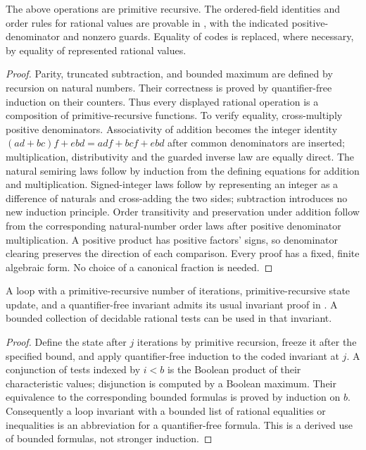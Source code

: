 \begin{proposition}\label{found:rat}
The above operations are primitive recursive. The ordered-field identities and order rules for rational values are provable in \ipra, with the indicated positive-denominator and nonzero guards. Equality of codes is replaced, where necessary, by equality of represented rational values.
\end{proposition}
\begin{proof}
Parity, truncated subtraction, and bounded maximum are defined by recursion on natural numbers. Their correctness is proved by quantifier-free induction on their counters. Thus every displayed rational operation is a composition of primitive-recursive functions. To verify equality, cross-multiply positive denominators. Associativity of addition becomes the integer identity
$(ad+bc)f+ebd=adf+bcf+ebd$ after common denominators are inserted; multiplication, distributivity and the guarded inverse law are equally direct. The natural semiring laws follow by induction from the defining equations for addition and multiplication. Signed-integer laws follow by representing an integer as a difference of naturals and cross-adding the two sides; subtraction introduces no new induction principle. Order transitivity and preservation under addition follow from the corresponding natural-number order laws after positive denominator multiplication. A positive product has positive factors' signs, so denominator clearing preserves the direction of each comparison. Every proof has a fixed, finite algebraic form. No choice of a canonical fraction is needed.
\end{proof}

\begin{lemma}\label{found:loops}
A loop with a primitive-recursive number of iterations, primitive-recursive state update, and a quantifier-free invariant admits its usual invariant proof in \ipra. A bounded collection of decidable rational tests can be used in that invariant.
\end{lemma}
\begin{proof}
Define the state after $j$ iterations by primitive recursion, freeze it after the specified bound, and apply quantifier-free induction to the coded invariant at $j$. A conjunction of tests indexed by $i<b$ is the Boolean product of their characteristic values; disjunction is computed by a Boolean maximum. Their equivalence to the corresponding bounded formulas is proved by induction on $b$. Consequently a loop invariant with a bounded list of rational equalities or inequalities is an abbreviation for a quantifier-free formula. This is a derived use of bounded formulas, not stronger induction.
\end{proof}

